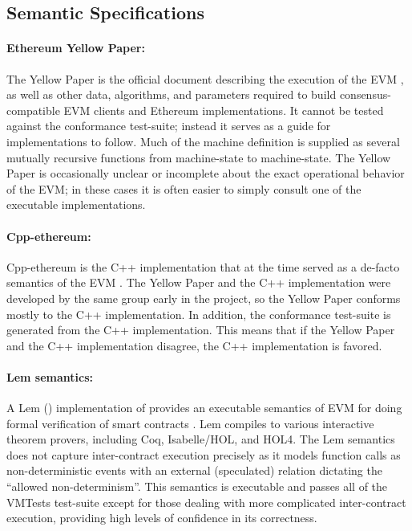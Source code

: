 \subsection{Semantic Specifications}

\paragraph{Ethereum Yellow Paper:}
The Yellow Paper is the official document describing the execution of the EVM
\cite{WoodReport14},
    as well as other data, algorithms,
    and parameters required to build consensus-compatible
    EVM clients and Ethereum implementations.
It cannot be tested against the conformance test-suite;
instead it serves as a guide for implementations to follow.
Much of the machine definition is supplied as several mutually
recursive functions from machine-state to machine-state.
The Yellow Paper is occasionally unclear or incomplete about
the exact operational behavior of the EVM;
in these cases it is often easier to simply consult one of the executable implementations.

\paragraph{Cpp-ethereum:}
Cpp-ethereum is the
C++ implementation that at the time served as a de-facto semantics of the EVM
\cite{CppEthereumUrl}.
The Yellow Paper and the C++ implementation were
developed by the same group early in the project,
          so the Yellow Paper conforms mostly to the C++ implementation.
In addition, the conformance test-suite is generated from the C++ implementation.
This means that if the Yellow Paper and the C++ implementation disagree,
     the C++ implementation is favored.

\paragraph{Lem semantics:}
A Lem (\cite{MulliganSIGPLAN14}) implementation of \EVM{} provides
an executable semantics of EVM for doing formal verification of smart contracts \cite{HiraiWSTC17}.
Lem compiles to various interactive theorem provers,
    including Coq, Isabelle/HOL, and HOL4.
The Lem semantics does not capture inter-contract
execution precisely as it models function calls as non-deterministic events with an external (speculated) relation dictating the ``allowed non-determinism''.
This semantics is executable and passes all of the VMTests
test-suite except for those dealing with more complicated inter-contract execution,
  providing high levels of confidence in its correctness.

